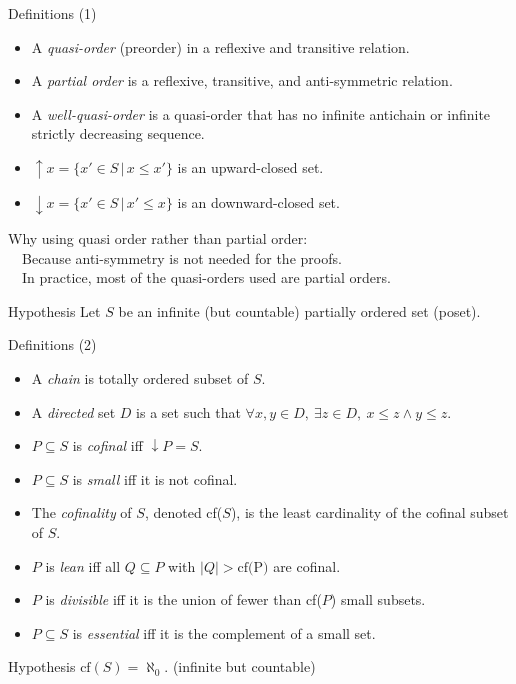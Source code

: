 \documentclass{beamer}
\begin{document}
\begin{frame}{Definitions (1)}
  
\begin{itemize}
\item A \emph{quasi-order} (preorder) in a reflexive and transitive relation.
\item A \emph{partial order} is a reflexive, transitive, and anti-symmetric relation.
\item A \emph{well-quasi-order} is a quasi-order that has no infinite antichain or infinite strictly decreasing sequence.
\item $\uparrow x = \{ x' \in S \,|\, x \leq x' \}$ is an upward-closed set.
\item $\downarrow x = \{ x' \in S \,|\, x' \leq x \}$ is an downward-closed set.
\end{itemize}

  \vspace{10pt}

Why using quasi order rather than partial order:\\
\mbox{}~~Because anti-symmetry is not needed for the proofs.\\
\mbox{}~~In practice, most of the quasi-orders used are partial orders.

\begin{block}{Hypothesis}
Let $S$ be an infinite (but countable) partially ordered set (poset).
\end{block}

\end{frame}

\begin{frame}{Definitions (2)}

\begin{itemize}
\item A \emph{chain} is totally ordered subset of $S$.
\item A \emph{directed} set $D$ is a set such that $\forall x,y \in D, ~ \exists z \in D, ~ x \leq z \land y \leq z$.
\item $P \subseteq S$ is \emph{cofinal} iff $\downarrow P = S$.
\item $P \subseteq S$ is \emph{small} iff it is not cofinal.
\item The \emph{cofinality} of $S$, denoted cf($S$), is the least cardinality of the cofinal subset of $S$.
\item $P$ is \emph{lean} iff all $Q \subseteq P$ with $|Q| > \text{cf}($P$)$ are cofinal.
\item $P$ is \emph{divisible} iff it is the union of fewer than cf($P$) small subsets.
\item $P \subseteq S$ is \emph{essential} iff it is the complement of a small set.
\end{itemize}

\begin{block}{Hypothesis}
$\text{cf}(S) = \aleph_0$. (infinite but countable)
\end{block}

\end{frame}
\end{document}
